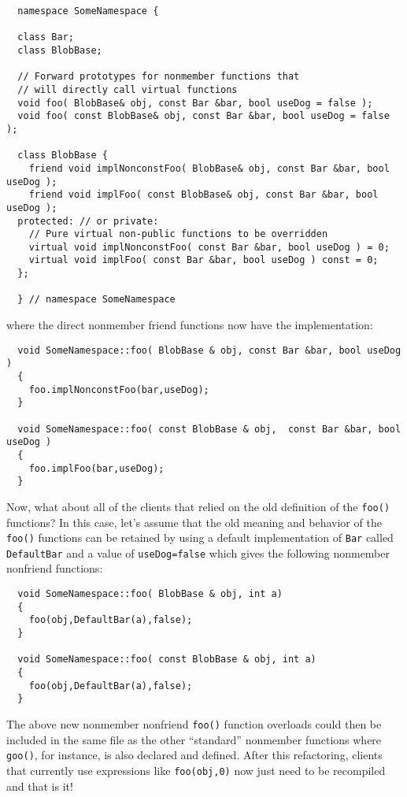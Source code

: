 \documentclass[pdf,ps2pdf,11pt]{SANDreport}
\begin{document}
{\small\begin{verbatim}
  namespace SomeNamespace {

  class Bar;
  class BlobBase;

  // Forward prototypes for nonmember functions that
  // will directly call virtual functions
  void foo( BlobBase& obj, const Bar &bar, bool useDog = false );
  void foo( const BlobBase& obj, const Bar &bar, bool useDog = false );

  class BlobBase {
    friend void implNonconstFoo( BlobBase& obj, const Bar &bar, bool useDog );
    friend void implFoo( const BlobBase& obj, const Bar &bar, bool useDog );
  protected: // or private:
    // Pure virtual non-public functions to be overridden
    virtual void implNonconstFoo( const Bar &bar, bool useDog ) = 0;
    virtual void implFoo( const Bar &bar, bool useDog ) const = 0;
  };

  } // namespace SomeNamespace
\end{verbatim}}

{}\noindent{}where the direct nonmember friend functions now have the
implementation:

{\small\begin{verbatim}
  void SomeNamespace::foo( BlobBase & obj, const Bar &bar, bool useDog )
  {
    foo.implNonconstFoo(bar,useDog);
  }

  void SomeNamespace::foo( const BlobBase & obj,  const Bar &bar, bool useDog )
  {
    foo.implFoo(bar,useDog);
  }
\end{verbatim}}

Now, what about all of the clients that relied on the old definition of the
{}\texttt{foo()} functions?  In this case, let's assume that the old meaning
and behavior of the {}\texttt{foo()} functions can be retained by using a
default implementation of {}\texttt{Bar} called {}\texttt{DefaultBar} and a
value of {}\texttt{useDog=false} which gives the following nonmember nonfriend
functions:

{\small\begin{verbatim}
  void SomeNamespace::foo( BlobBase & obj, int a)
  {
    foo(obj,DefaultBar(a),false);
  }

  void SomeNamespace::foo( const BlobBase & obj, int a)
  {
    foo(obj,DefaultBar(a),false);
  }
\end{verbatim}}

The above new nonmember nonfriend {}\texttt{foo()} function overloads could
then be included in the same file as the other ``standard'' nonmember
functions where {}\texttt{goo()}, for instance, is also declared and defined.
After this refactoring, clients that currently use expressions like
{}\texttt{foo(obj,0)} now just need to be recompiled and that is it!
\end{document}
